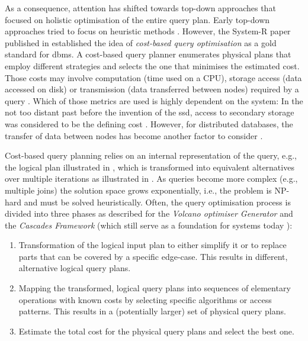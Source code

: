 As a consequence, attention has shifted towards top-down approaches that focused on holistic optimisation of the entire query plan. Early top-down approaches tried to focus on heuristic methods \cite{Jarke:1984Query}. However, the System-R paper \cite{Selinger:1979Access} published in \citeyear{Selinger:1979Access} established the idea of \emph{cost-based query optimisation} as a gold standard for \acrshort{dbms}. A cost-based query planner enumerates physical plans that employ different strategies and selects the one that minimises the estimated cost. Those costs may involve computation (time used on a CPU), storage access (data accessed on disk) or transmission (data transferred between nodes) required by a query \cite{Jarke:1984Query,Garcia:2009Database}. Which of those metrics are used is highly dependent on the system: In the not too distant past before the invention of the \acrfull{ssd}, access to secondary storage was considered to be the defining cost \cite{Garcia:2009Database}. However, for distributed databases, the transfer of data between nodes has become another factor to consider \cite{Bruno2013:Continuous}.

Cost-based query planning relies on an internal representation of the query, e.g., the logical plan illustrated in , which is transformed into equivalent alternatives over multiple iterations as illustrated in . As queries become more complex (e.g., multiple joins) the solution space grows exponentially, i.e., the problem is NP-hard and must be solved heuristically. Often, the query optimisation process is divided into three phases as described for the \emph{Volcano optimiser Generator}  \cite{Jarke:1984Query,Graefe:1993Volcano} and the \emph{Cascades Framework} \cite{Graefe:1995Cascades} (which still serve as a foundation for systems today \cite{Soliman:Orca2014,Begoli:2018Apache}):

\begin{enumerate}
    \item Transformation of the logical input plan to either simplify it or to replace parts that can be covered by a specific edge-case. This results in different, alternative logical query plans.
    \item Mapping the transformed, logical query plans into sequences of elementary operations with known costs by selecting specific algorithms or access patterns. This results in a (potentially larger) set of physical query plans.
    \item Estimate the total cost for the physical query plans and select the best one.
\end{enumerate}

